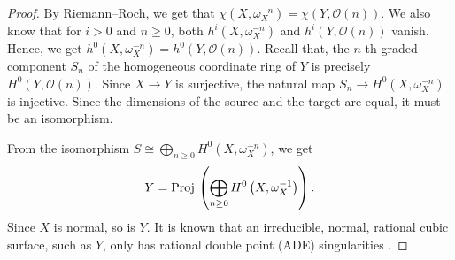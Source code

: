 \documentclass[11pt,reqno, letterpaper]{amsart}
\renewcommand{\to}{{\longrightarrow}}
\numberwithin{equation}{section}
\renewcommand{\O}{\mathcal O}
\newcommand{\Proj}{{\text{\rm Proj}\,}}
\begin{document}
\begin{proof}
  By Riemann--Roch, we get that $\chi(X,\omega_X^{-n}) = \chi(Y, \O(n))$.
  We also know that for $i > 0$ and $n \geq 0$, both $h^i(X, \omega_X^{-n})$ and $h^i(Y, \O(n))$ vanish.
  Hence, we get $h^0(X, \omega_X^{-n}) = h^0(Y, \O(n))$.
  Recall that, the $n$-th graded component $S_n$ of the homogeneous coordinate ring of $Y$ is precisely $H^0(Y, \O(n))$.
  Since $X \to Y$ is surjective, the natural map $S_n \to H^0(X, \omega_X^{-n})$ is injective.
  Since the dimensions of the source and the target are equal, it must be an isomorphism.

  From the isomorphism $S \cong \bigoplus_{n \geq 0} H^0(X, \omega_X^{-n})$, we get
  \[ Y = \Proj\left( \bigoplus_{n \geq 0}H^0\left(X, \omega_X^{-1} \right) \right).\]
  Since $X$ is normal, so is $Y$.
  It is known that an irreducible, normal, rational cubic surface, such as $Y$, only has rational double point (ADE) singularities \cite{bru.wal:79}.
\end{proof}
\end{document}
